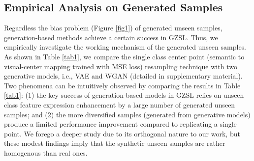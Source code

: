 \documentclass{article}
\begin{document}
	\subsection{Empirical Analysis on Generated Samples }
\label{prior}
	\begin{table}[H]
		\centering
		\caption{ZSL (T1) and GZSL () results of the simple semantic-visual mapping net (denoted as MSE) and two different generative models, VAE and WGAN on AWA2. {\bf G.N.} denotes the generation number per unseen class (588 is the class averaged number of real seen samples).}
        \vspace{-2ex}
		\label{tab1}
	\end{table}
	Regardless the bias problem (Figure \ref{fig1}) of generated unseen samples, generation-based methods achieve a certain success in GZSL. Thus, we empirically investigate the working mechanism of the generated unseen samples. As shown in Table \ref{tab1}, we compare the single class center point (semantic to visual-center mapping trained with MSE loss) resampling technique with two generative models, i.e., VAE \cite{kingma2013auto} and WGAN \cite{gulrajani2017improved} (detailed in supplementary material). Two phenomena can be intuitively observed by comparing the results in Table \ref{tab1}: (1) the key success of generation-based models in GZSL relies on unseen class feature expression enhancement by a large number of generated unseen samples; and (2) the more diversified samples (generated from generative models) produce a limited performance improvement compared to replicating a single point. We forego a deeper study due to its orthogonal nature to our work, but these modest findings imply that the synthetic unseen samples are rather homogenous than real ones.
	
\end{document}
